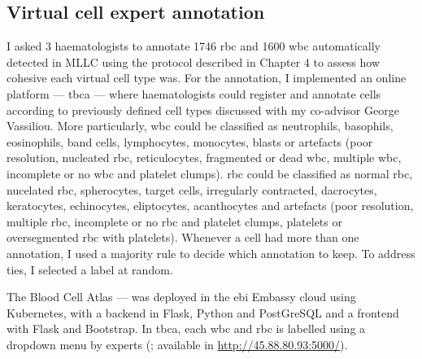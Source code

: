 \begin{figure}[!ht]
    \label{fig:multi-objective-importance}
\end{figure}

\begin{figure}[!ht]
    \label{fig:multi-objective-cell-examples}
\end{figure}

\subsection{Virtual cell expert annotation}

I asked 3 haematologists to annotate 1746 \ac{rbc} and 1600 \ac{wbc} automatically detected in MLLC using the protocol described in Chapter 4 to assess how cohesive each virtual cell type was. For the annotation, I implemented an online platform --- \ac{tbca} --- where haematologists could register and annotate cells according to previously defined cell types discussed with my co-advisor George Vassiliou. More particularly, \ac{wbc} could be classified as neutrophils, basophils, eosinophils, band cells, lymphocytes, monocytes, blasts or artefacts (poor resolution, nucleated \ac{rbc}, reticulocytes, fragmented or dead \ac{wbc}, multiple \ac{wbc}, incomplete or no \ac{wbc} and platelet clumps). \Ac{rbc} could be classified as normal \ac{rbc}, nucelated \ac{rbc}, spherocytes, target cells, irregularly contracted, dacrocytes, keratocytes, echinocytes, eliptocytes, acanthocytes and artefacts (poor resolution, multiple \ac{rbc}, incomplete or no \ac{rbc} and platelet clumps, platelets or oversegmented \ac{rbc} with platelets). Whenever a cell had more than one annotation, I used a majority rule to decide which annotation to keep. To address ties, I selected a label at random.

The Blood Cell Atlas --- was deployed in the \ac{ebi} Embassy cloud using Kubernetes, with a backend in Flask, Python and PostGreSQL and a frontend with Flask and Bootstrap. In \ac{tbca}, each \ac{wbc} and \ac{rbc} is labelled using a dropdown menu by experts (; available in \url{http://45.88.80.93:5000/}).

